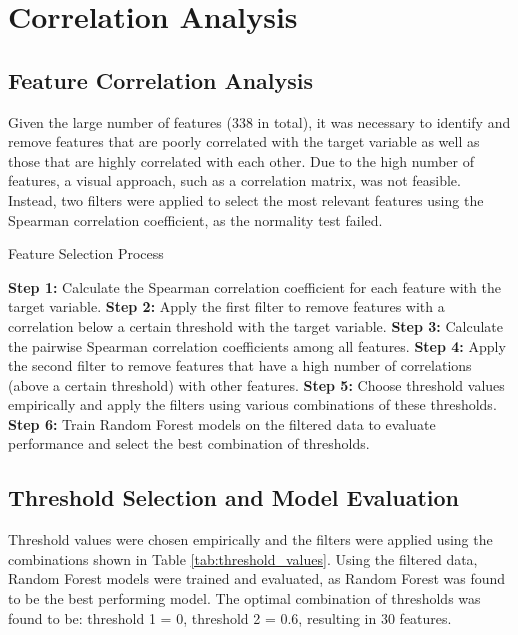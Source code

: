\section{Correlation Analysis}

\subsection{Feature Correlation Analysis}

Given the large number of features (338 in total), it was necessary to identify and remove features that are poorly correlated with the target variable as well as those that are highly correlated with each other. Due to the high number of features, a visual approach, such as a correlation matrix, was not feasible. Instead, two filters were applied to select the most relevant features using the Spearman correlation coefficient, as the normality test failed.

\begin{algorithm}
    \caption{Feature Selection Process}
    \begin{algorithmic}[1]
        \State \textbf{Step 1:} Calculate the Spearman correlation coefficient for each feature with the target variable.
        \State \textbf{Step 2:} Apply the first filter to remove features with a correlation below a certain threshold with the target variable.
        \State \textbf{Step 3:} Calculate the pairwise Spearman correlation coefficients among all features.
        \State \textbf{Step 4:} Apply the second filter to remove features that have a high number of correlations (above a certain threshold) with other features.
        \State \textbf{Step 5:} Choose threshold values empirically and apply the filters using various combinations of these thresholds.
        \State \textbf{Step 6:} Train Random Forest models on the filtered data to evaluate performance and select the best combination of thresholds.
    \end{algorithmic}
    \end{algorithm}

\subsection{Threshold Selection and Model Evaluation}

Threshold values were chosen empirically and the filters were applied using the combinations shown in Table \ref{tab:threshold_values}. Using the filtered data, Random Forest models were trained and evaluated, as Random Forest was found to be the best performing model. The optimal combination of thresholds was found to be: threshold 1 = 0, threshold 2 = 0.6, resulting in 30 features.

